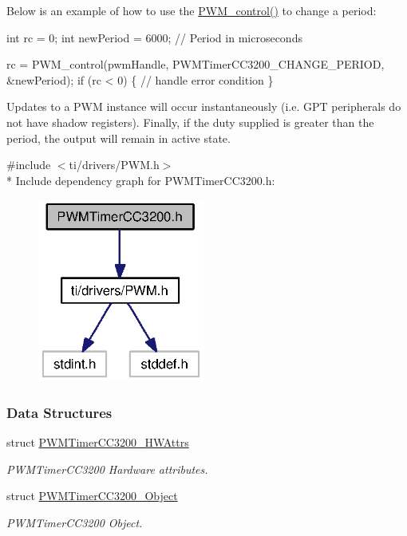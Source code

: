 Below is an example of how to use the \hyperlink{_p_w_m_8h_ade999f5b12997479efa1ac85aaf46ef5}{P\+W\+M\+\_\+control()} to change a period\+:


\begin{DoxyCode}
\textcolor{keywordtype}{int} rc = 0;
\textcolor{keywordtype}{int} newPeriod = 6000;   \textcolor{comment}{// Period in microseconds}

rc = PWM_control(pwmHandle, PWMTimerCC3200_CHANGE_PERIOD, &newPeriod);
\textcolor{keywordflow}{if} (rc < 0) \{
  \textcolor{comment}{// handle error condition}
\}
\end{DoxyCode}


Updates to a P\+W\+M instance will occur instantaneously (i.\+e. G\+P\+T peripherals do not have shadow registers). Finally, if the duty supplied is greater than the period, the output will remain in active state. 

{\ttfamily \#include $<$ti/drivers/\+P\+W\+M.\+h$>$}\\*
Include dependency graph for P\+W\+M\+Timer\+C\+C3200.\+h\+:
\nopagebreak
\begin{figure}[H]
\begin{center}
\leavevmode
\includegraphics[width=155pt]{_p_w_m_timer_c_c3200_8h__incl}
\end{center}
\end{figure}
\subsubsection*{Data Structures}
\begin{DoxyCompactItemize}
\item 
struct \hyperlink{struct_p_w_m_timer_c_c3200___h_w_attrs}{P\+W\+M\+Timer\+C\+C3200\+\_\+\+H\+W\+Attrs}
\begin{DoxyCompactList}\small\item\em P\+W\+M\+Timer\+C\+C3200 Hardware attributes. \end{DoxyCompactList}\item 
struct \hyperlink{struct_p_w_m_timer_c_c3200___object}{P\+W\+M\+Timer\+C\+C3200\+\_\+\+Object}
\begin{DoxyCompactList}\small\item\em P\+W\+M\+Timer\+C\+C3200 Object. \end{DoxyCompactList}\end{DoxyCompactItemize}
